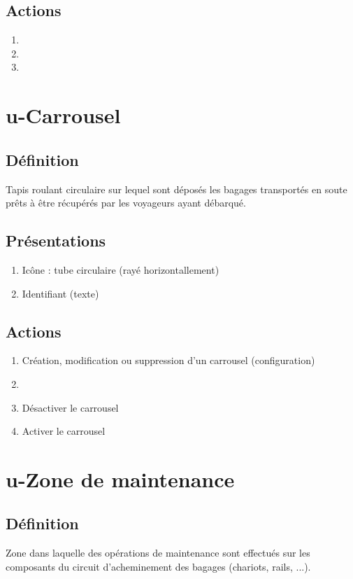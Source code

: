 \subsection{Actions}
\begin{enumerate}
	\item {}
	\item {}
	\item \transit
\end{enumerate}

\section{u-Carrousel}
\subsection{Définition}
	Tapis roulant circulaire sur lequel sont déposés les bagages transportés en soute prêts à être récupérés par les voyageurs
	ayant débarqué.

\subsection{Présentations}
\begin{enumerate}
	\item Icône : tube circulaire (rayé horizontallement)
	\item Identifiant (texte)
\end{enumerate}

\subsection{Actions}
\begin{enumerate}
	\item Création, modification ou suppression d'un carrousel (configuration)
	\item \etat
	\item Désactiver le carrousel
	\item Activer le carrousel
\end{enumerate}

\section{u-Zone de maintenance}
\subsection{Définition}
	Zone dans laquelle des opérations de maintenance sont effectués sur les composants du circuit d'acheminement des bagages
	(chariots, rails, ...).

